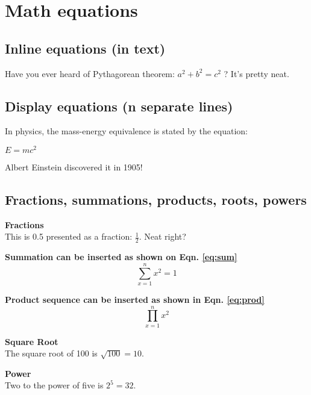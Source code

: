 \section{Math equations}

\subsection{Inline equations (in text)}
Have you ever heard of Pythagorean theorem: \(a^2 + b^2 = c^2\) ? It's pretty neat.

\subsection{Display equations (n separate lines)}
In physics, the mass-energy equivalence is stated by the equation:
\begin{center}
    $E=mc^2$
\end{center}
Albert Einstein discovered it in 1905!

\subsection{Fractions, summations, products, roots, powers}
    \textbf{Fractions}\\
        This is 0.5 presented as a fraction: \( \frac{1}{2} \). Neat right?\\
        \vspace{0.5cm}

    \textbf{Summation can be inserted as shown on Eqn. \ref{eq:sum}}\\
        \begin{equation}
            \sum_{x=1}^{n}x^2=1
            \label{eq:sum}
        \end{equation}
        \vspace{0.5cm}
    
    \textbf{Product sequence can be inserted as shown in Eqn. \ref{eq:prod}}\\
        \begin{equation}
            \prod_{x=1}^{n}x^2
            \label{eq:prod}
        \end{equation}
        \vspace{0.5cm}

    \textbf{Square Root}\\
        The square root of 100 is \(\sqrt{100}=10\). 
        \vspace{0.5cm}

    \textbf{Power}\\
        Two to the power of five is \(2^5 = 32 \). 
        \vspace{0.5cm}